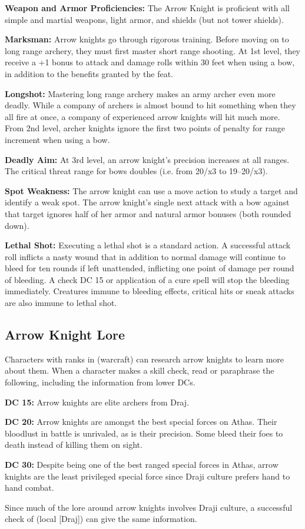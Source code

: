 \textbf{Weapon and Armor Proficiencies:} The Arrow Knight is proficient with all simple and martial weapons, light armor, and shields (but not tower shields).

\textbf{Marksman:} Arrow knights go through rigorous training. Before moving on to long range archery, they must first master short range shooting. At 1st level, they receive a +1 bonus to attack and damage rolls within 30 feet when using a bow, in addition to the benefits granted by the  feat.

\textbf{Longshot:} Mastering long range archery makes an army archer even more deadly. While a company of archers is almost bound to hit something when they all fire at once, a company of experienced arrow knights will hit much more. From 2nd level, archer knights ignore the first two points of penalty for range increment when using a bow.

\textbf{Deadly Aim:} At 3rd level, an arrow knight's precision increases at all ranges. The critical threat range for bows doubles (i.e. from 20/x3 to 19--20/x3).

\textbf{Spot Weakness:} The arrow knight can use a move action to study a target and identify a weak spot. The arrow knight's single next attack with a bow against that target ignores half of her armor and natural armor bonuses (both rounded down).

\textbf{Lethal Shot:} Executing a lethal shot is a standard action. A successful attack roll inflicts a nasty wound that in addition to normal damage will continue to bleed for ten rounds if left unattended, inflicting one point of damage per round of bleeding. A  check DC 15 or application of a cure spell will stop the bleeding immediately. Creatures immune to bleeding effects, critical hits or sneak attacks are also immune to lethal shot.

\subsection{Arrow Knight Lore}
Characters with ranks in  (warcraft) can research arrow knights to learn more about them. When a character makes a skill check, read or paraphrase the following, including the information from lower DCs.

\textbf{DC 15:} Arrow knights are elite archers from Draj.

\textbf{DC 20:} Arrow knights are amongst the best special forces on Athas. Their bloodlust in battle is unrivaled, as is their precision. Some bleed their foes to death instead of killing them on sight.

\textbf{DC 30:} Despite being one of the best ranged special forces in Athas, arrow knights are the least privileged special force since Draji culture prefers hand to hand combat.

Since much of the lore around arrow knights involves Draji culture, a successful check of  (local [Draj]) can give the same information.